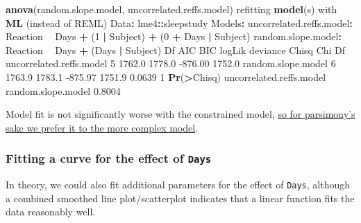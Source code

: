 \documentclass[]{article}
\newenvironment{Shaded}{\begin{snugshade}}{\end{snugshade}}
\newcommand{\DecValTok}[1]{\textcolor[rgb]{0.00,0.00,0.81}{#1}}
\newcommand{\FloatTok}[1]{\textcolor[rgb]{0.00,0.00,0.81}{#1}}
\newcommand{\KeywordTok}[1]{\textcolor[rgb]{0.13,0.29,0.53}{\textbf{#1}}}
\newcommand{\NormalTok}[1]{#1}
\newcommand{\OperatorTok}[1]{\textcolor[rgb]{0.81,0.36,0.00}{\textbf{#1}}}
\newcommand{\StringTok}[1]{\textcolor[rgb]{0.31,0.60,0.02}{#1}}
\begin{document}
\begin{Shaded}
\begin{Highlighting}[]
\KeywordTok{anova}\NormalTok{(random.slope.model, uncorrelated.reffs.model)}
\NormalTok{refitting }\KeywordTok{model}\NormalTok{(s) with }\KeywordTok{ML}\NormalTok{ (instead of REML)}
\NormalTok{Data}\OperatorTok{:}\StringTok{ }\NormalTok{lme4}\OperatorTok{::}\NormalTok{sleepstudy}
\NormalTok{Models}\OperatorTok{:}
\NormalTok{uncorrelated.reffs.model}\OperatorTok{:}\StringTok{ }\NormalTok{Reaction }\OperatorTok{~}\StringTok{ }\NormalTok{Days }\OperatorTok{+}\StringTok{ }\NormalTok{(}\DecValTok{1} \OperatorTok{|}\StringTok{ }\NormalTok{Subject) }\OperatorTok{+}\StringTok{ }\NormalTok{(}\DecValTok{0} \OperatorTok{+}\StringTok{ }\NormalTok{Days }\OperatorTok{|}\StringTok{ }\NormalTok{Subject)}
\NormalTok{random.slope.model}\OperatorTok{:}\StringTok{ }\NormalTok{Reaction }\OperatorTok{~}\StringTok{ }\NormalTok{Days }\OperatorTok{+}\StringTok{ }\NormalTok{(Days }\OperatorTok{|}\StringTok{ }\NormalTok{Subject)}
\NormalTok{                         Df    AIC    BIC  logLik deviance  Chisq Chi Df}
\NormalTok{uncorrelated.reffs.model  }\DecValTok{5} \FloatTok{1762.0} \FloatTok{1778.0} \FloatTok{-876.00}   \FloatTok{1752.0}              
\NormalTok{random.slope.model        }\DecValTok{6} \FloatTok{1763.9} \FloatTok{1783.1} \FloatTok{-875.97}   \FloatTok{1751.9} \FloatTok{0.0639}      \DecValTok{1}
                         \KeywordTok{Pr}\NormalTok{(}\OperatorTok{>}\NormalTok{Chisq)}
\NormalTok{uncorrelated.reffs.model           }
\NormalTok{random.slope.model           }\FloatTok{0.8004}
\end{Highlighting}
\end{Shaded}

Model fit is not significantly worse with the constrained model,
\protect\hyperlink{over-fitting}{so for parsimony's sake we prefer it to the more complex model}.

\hypertarget{growth-curve-sleep-example}{%
\subsubsection*{\texorpdfstring{Fitting a curve for the effect of \texttt{Days}}{Fitting a curve for the effect of Days}}\label{growth-curve-sleep-example}}

In theory, we could also fit additional parameters for the effect of \texttt{Days},
although a combined smoothed line plot/scatterplot indicates that a linear
function fits the data reasonably well.
\end{document}
